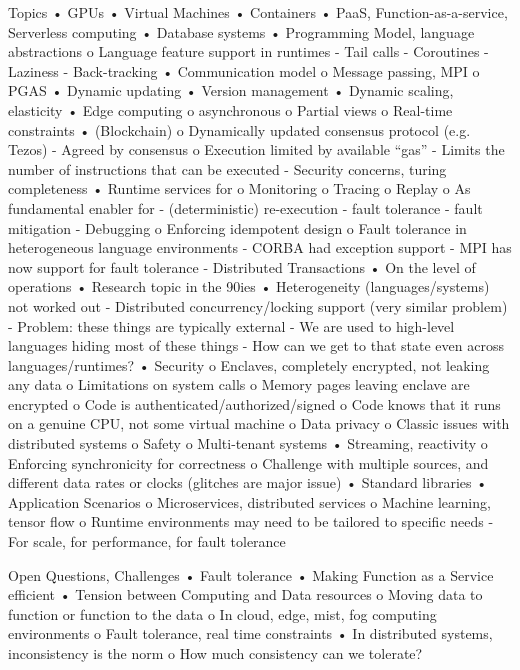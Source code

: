 \begin{bibunit}
\begin{noteco}
  Topics
  •	GPUs
  •	Virtual Machines
  •	Containers
  •	PaaS, Function-as-a-service, Serverless computing
  •	Database systems
  •	Programming Model, language abstractions
     o	Language feature support in runtimes
       - Tail calls
       - Coroutines
       - Laziness
       - Back-tracking
  •	Communication model
     o	Message passing, MPI
     o	PGAS
  •	Dynamic updating
  •	Version management
  •	Dynamic scaling, elasticity
  •	Edge computing
     o	asynchronous 
     o	Partial views
     o	Real-time constraints
  •	(Blockchain)
     o	Dynamically updated consensus protocol (e.g. Tezos)
       - Agreed by consensus
     o	Execution limited by available “gas”
       - Limits the number of instructions that can be executed
       - Security concerns, turing completeness
  •	Runtime services for
     o	Monitoring
     o	Tracing
     o	Replay
     o	As fundamental enabler for
       - (deterministic) re-execution
       - fault tolerance
       - fault mitigation
       - Debugging
     o	Enforcing idempotent design
     o	Fault tolerance in heterogeneous language environments
       - CORBA had exception support
       - MPI has now support for fault tolerance
       - Distributed Transactions
  •	On the level of operations
  •	Research topic in the 90ies
  •	Heterogeneity (languages/systems) not worked out
       - Distributed concurrency/locking support (very similar problem)
       - Problem: these things are typically external
       - We are used to high-level languages hiding most of these things
       - How can we get to that state even across languages/runtimes?
  •	Security
     o	Enclaves, completely encrypted, not leaking any data
     o	Limitations on system calls
     o	Memory pages leaving enclave are encrypted
     o	Code is authenticated/authorized/signed
     o	Code knows that it runs on a genuine CPU, not some virtual machine
     o	Data privacy
     o	Classic issues with distributed systems
     o	Safety
     o	Multi-tenant systems
  •	Streaming, reactivity
     o	Enforcing synchronicity for correctness
     o	Challenge with multiple sources, and different data rates or clocks (glitches are major issue)
  •	Standard libraries
  •	Application Scenarios
     o	Microservices, distributed services
     o	Machine learning, tensor flow
     o	Runtime environments may need to be tailored to specific needs
       - For scale, for performance, for fault tolerance

  Open Questions, Challenges
  •	Fault tolerance
  •	Making Function as a Service efficient
  •	Tension between Computing and Data resources
     o	Moving data to function or function to the data
     o	In cloud, edge, mist, fog computing environments
     o	Fault tolerance, real time constraints
  •	In distributed systems, inconsistency is the norm
     o	How much consistency can we tolerate?


\end{noteco}
\end{bibunit}
